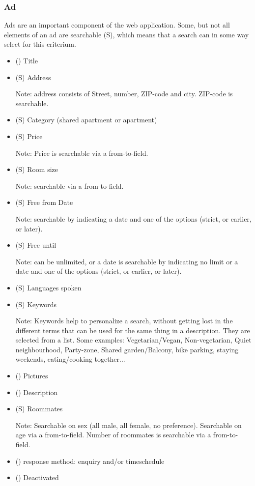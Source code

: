 \documentclass[a4wide]{article}
\begin{document}
\subsubsection{Ad}
Ads are an important component of the web application. 
Some, but not all elements of an ad are searchable (S),
which means that a search can in some way select for this criterium.
\begin{itemize}
\item () Title
\item (S) Address

	Note: address consists of Street, number, ZIP-code and city. ZIP-code is searchable.
\item (S) Category (shared apartment or apartment)
\item (S) Price

	Note: Price is searchable via a from-to-field.
\item (S) Room size

	Note: searchable via a from-to-field.
\item (S) Free from Date

	Note: searchable by indicating a date and one of the options (strict, or earlier, or later).
\item (S) Free until

	Note: can be unlimited, or a date
	is searchable by indicating no limit or a date and one of the options (strict, or earlier, or later).
\item (S) Languages spoken
\item (S) Keywords

	Note: Keywords help to personalize a search, without getting lost in the different terms 
	that can be used for the same thing in a description.
	They are selected from a list.
	Some examples: Vegetarian/Vegan, Non-vegetarian, Quiet neighbourhood, Party-zone, 
	Shared garden/Balcony, bike parking, staying weekends, eating/cooking together...
\item () Pictures
\item () Description
\item (S) Roommates

	Note: Searchable on sex (all male, all female, no preference).
	Searchable on age via a from-to-field.
	Number of roommates is searchable via a from-to-field.
\item () response method: enquiry and/or timeschedule 
\item () Deactivated
\end{itemize}
\end{document}
